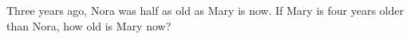 Three years ago, Nora was half as old as Mary is now. If Mary is four years older than Nora, how old is Mary now?
